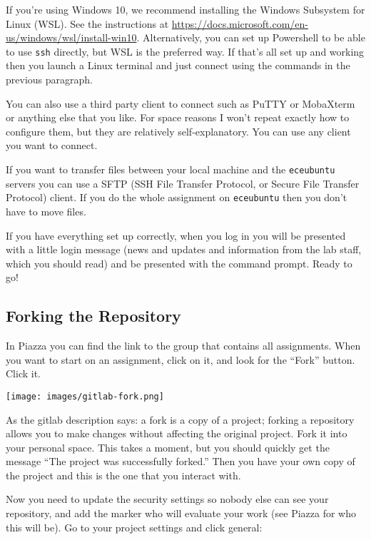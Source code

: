 If you're using Windows 10, we recommend installing the Windows Subsystem for Linux (WSL). See the instructions at \url{https://docs.microsoft.com/en-us/windows/wsl/install-win10}. Alternatively, you can set up Powershell to be able to use \texttt{ssh} directly, but WSL is the preferred way. If that's all set up and working then you launch a Linux terminal and just connect using the commands in the previous paragraph.

You can also use a third party client to connect such as PuTTY or MobaXterm or anything else that you like. For space reasons I won't repeat exactly how to configure them, but they are relatively self-explanatory. You can use any client you want to connect.

If you want to transfer files between your local machine and the \texttt{eceubuntu} servers you can use a SFTP (SSH File Transfer Protocol, or Secure File Transfer Protocol) client. If you do the whole assignment on \texttt{eceubuntu} then you don't have to move files.

If you have everything set up correctly, when you log in you will be presented with a little login message (news and updates and information from the lab staff, which you should read) and be presented with the command prompt. Ready to go!

\subsection*{Forking the Repository}
In Piazza you can find the link  to the group that contains all assignments. When you want to start on an assignment, click on it, and look for the ``Fork'' button. Click it.

\begin{center}
	\texttt{[image: images/gitlab-fork.png]}
\end{center}

As the gitlab description says: a fork is a copy of a project; forking a repository allows you to make changes without affecting the original project. Fork it into your personal space. This takes a moment, but you should quickly get the message ``The project was successfully forked.'' Then you have your own copy of the project and this is the one that you interact with.

Now you need to update the security settings so nobody else can see your repository, and add the marker who will evaluate your work (see Piazza for who this will be). Go to your project settings and click general:

